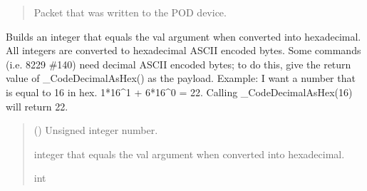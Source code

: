 \documentclass[letterpaper,10pt,english]{sphinxmanual}
\begin{document}
\begin{fulllineitems}
\begin{fulllineitems}
\begin{quote}
\begin{description}
\begin{itemize}
\end{itemize}

\sphinxAtStartPar
Packet that was written to the POD device.

\sphinxAtStartPar
{\hyperref[\detokenize{Morelia.Packets:Morelia.Packets.Standard.PacketStandard}]{}}

\end{description}\end{quote}

\end{fulllineitems}


\begin{fulllineitems}
\label{\detokenize{Morelia.Devices:Morelia.Devices.PodDevice_8229.Pod8229._CodeDecimalAsHex}}
\pysigstartsignatures
{}
\pysigstopsignatures
\sphinxAtStartPar
Builds an integer that equals the val argument when converted into hexadecimal.         All integers are converted to hexadecimal ASCII encoded bytes. Some commands         (i.e. 8229 \#140) need decimal ASCII encoded bytes; to do this, give the return         value of \_CodeDecimalAsHex() as the payload. Example: I want a number that is         equal to 16 in hex. 1*16\textasciicircum{}1 + 6*16\textasciicircum{}0 = 22. Calling \_CodeDecimalAsHex(16) will         return 22.
\begin{quote}\begin{description}
\sphinxAtStartPar
{} () \textendash{} Unsigned integer number.

\sphinxAtStartPar
integer that equals the val argument when converted into hexadecimal.

\sphinxAtStartPar
int

\end{description}\end{quote}

\end{fulllineitems}


\end{fulllineitems}
\end{document}
